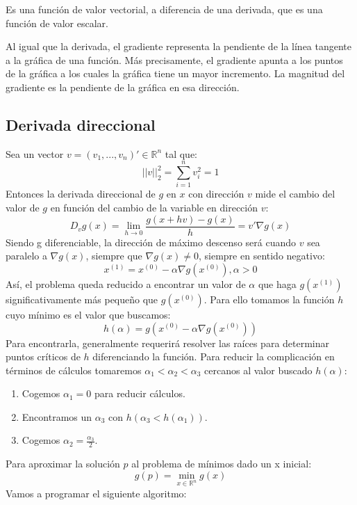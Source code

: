 Es una función de valor vectorial, a diferencia de una derivada, que es una función de valor escalar.

Al igual que la derivada, el gradiente representa la pendiente de la línea tangente a la gráfica de una función. Más precisamente, el gradiente apunta a los puntos de la gráfica a los cuales la gráfica tiene un mayor incremento. La magnitud del gradiente es la pendiente de la gráfica en esa dirección.

\subsection{Derivada direccional}
Sea un vector $v = (v_1, ... , v_n)' \in \mathbb{R}^n$ tal que:
\[||v||_2^2 = \sum_{i=1}^{n} v_i^2 = 1\]
Entonces la derivada direccional de $g$ en $x$ con dirección $v$ mide el cambio del valor de $g$ en función del cambio de la variable en dirección $v$:
\[D_vg(x) = \lim\limits_{h \rightarrow 0}\frac{g(x+hv)-g(x)}{h} = v' \nabla g(x)\]
Siendo g diferenciable, la dirección de máximo descenso será cuando $v$ sea paralelo a $\nabla g(x)$, siempre que $\nabla g(x) \neq 0$, siempre en sentido negativo:
\[x^{(1)} = x^{(0)} - \alpha \nabla g(x^{(0)}), \alpha > 0\]
Así, el problema queda reducido a encontrar un valor de $\alpha$ que haga $g(x^{(1)})$ significativamente más pequeño que $g(x^{(0)})$. Para ello tomamos la función $h$ cuyo mínimo es el valor que buscamos:
\[ h(\alpha) = g( x^{(0)}-\alpha \nabla g(x^{(0)}) ) \]
Para encontrarla, generalmente requerirá resolver las raíces para determinar puntos críticos de $h$ diferenciando la función. Para reducir la complicación en términos de cálculos tomaremos $\alpha_1 < \alpha_2 < \alpha_3$ cercanos al valor buscado $h(\alpha)$:
\begin{enumerate}
	\item Cogemos $\alpha_1 = 0$ para reducir cálculos.
	\item Encontramos un $\alpha_3$ con $h(\alpha_3 < h(\alpha_1))$.
	\item Cogemos $\alpha_2 = \frac{\alpha_3}{2}$.
\end{enumerate}

Para aproximar la solución $p$ al problema de mínimos dado un x inicial:
\[g(p) = \min_{x \in \mathbb{R}^n} g(x)\]
Vamos a programar el siguiente algoritmo:

